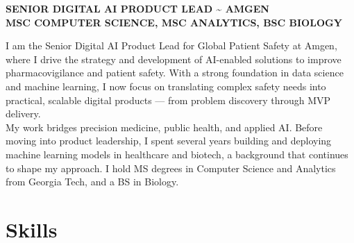 \documentclass[12pt,a4paper]{moderncv}
\begin{document}
\vspace*{-4\baselineskip}
\makecvtitle
\vspace{-1.5\baselineskip}

\begin{flushright}
\textbf{\large SENIOR DIGITAL AI PRODUCT LEAD \textasciitilde{} AMGEN} \\
\textbf{\large MSC COMPUTER SCIENCE, MSC ANALYTICS, BSC BIOLOGY} \\
\end{flushright}

I am the Senior Digital AI Product Lead for Global Patient Safety at Amgen, where I drive the strategy and development of AI-enabled solutions to improve pharmacovigilance and patient safety. With a strong foundation in data science and machine learning, I now focus on translating complex safety needs into practical, scalable digital products — from problem discovery through MVP delivery.\\

My work bridges precision medicine, public health, and applied AI. Before moving into product leadership, I spent several years building and deploying machine learning models in healthcare and biotech, a background that continues to shape my approach. I hold MS degrees in Computer Science and Analytics from Georgia Tech, and a BS in Biology.\\

\section{Skills}
\end{document}
